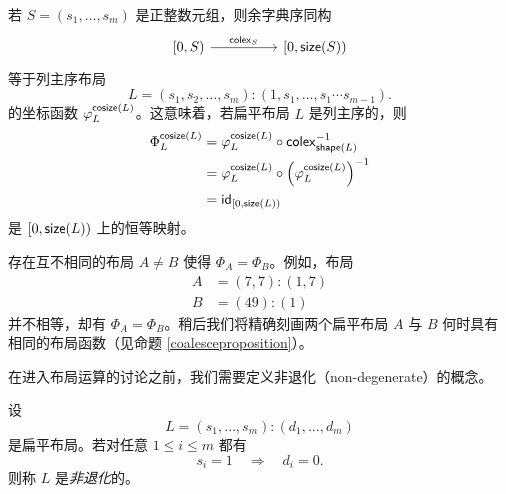 \begin{remark}
    若 $S = (s_1,\dots,s_m)$ 是正整数元组，则余字典序同构
    \[\begin{tikzcd}
    {[}0,S{)} \ar[rr,"\colex_S"] & & {[}0,\size(S){)}
    \end{tikzcd} \]
    等于列主序布局
    \[
    L = (s_1,s_2,\dots,s_m):(1,s_1,\dots,s_1 \cdots s_{m-1}).
    \]
    的坐标函数 $\varphi_{L}^{\mathsf{cosize}(L)}$。这意味着，若扁平布局 $L$ 是列主序的，则
    \begin{align*}
        \Phi_L^{\mathsf{cosize}(L)} & = \varphi_L^{\mathsf{cosize}(L)} \circ \mathsf{colex}_{\mathsf{shape}(L)}^{-1} \\
        & =  \varphi_L^{\mathsf{cosize}(L)} \circ \left(\varphi_L^{\mathsf{cosize}(L)}\right)^{-1}\\
        & = \mathsf{id}_{{[}0,\mathsf{size}(L){)}}
    \end{align*}
    是 $[0,\mathsf{size}(L))$ 上的恒等映射。
\end{remark}




\begin{remark}
    存在互不相同的布局 $A \neq B$ 使得 $\Phi_A = \Phi_{B}$。例如，布局
    \begin{align*}
        A & = (7,7) : (1,7)\\
        B & = (49) : (1)
    \end{align*}
    并不相等，却有 $\Phi_A = \Phi_{B}$。稍后我们将精确刻画两个扁平布局 $A$ 与 $B$ 何时具有相同的布局函数（见命题 \ref{coalesceproposition}）。
\end{remark}

在进入布局运算的讨论之前，我们需要定义非退化（non-degenerate）的概念。

\begin{definition}\label{definitionofnondegenerateflatlayout}
    设
    \[
    L = (s_1,\dots,s_m):(d_1,\dots,d_m)
    \]
    是扁平布局。若对任意 $1 \leq i \leq m$ 都有
    \[
    s_i = 1 \quad \Rightarrow \quad d_i = 0.
    \]
    则称 $L$ 是{\it 非退化}的。
\end{definition}

